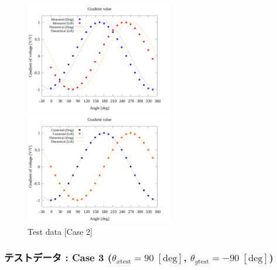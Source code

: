 \begin{figure}[htbp]
  \begin{minipage}[b]{0.45\linewidth}
    \centering
    \includegraphics[width=65mm]{../../02_workspace/result/rotation_tx=-15.0_ty=-20.0/plot/20/20_adjust-value.png}
  \end{minipage}
  \begin{minipage}[b]{0.45\linewidth}
    \centering
    \includegraphics[width=65mm]{../../02_workspace/result/rotation_tx=-15.0_ty=-20.0/plot/21/21-4_summary.png}
  \end{minipage}
  \caption{Test data [Case 2]}
\end{figure}

\subsubsection{テストデータ : Case 3 ($\theta_{x \mathrm{test}} = 90 \; \mathrm{[deg]}$, $\theta_{y \mathrm{test}} = -90 \; \mathrm{[deg]}$)}

